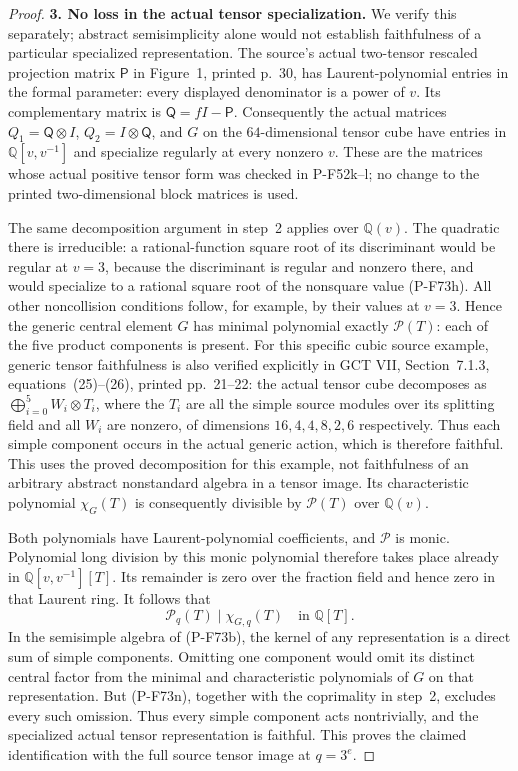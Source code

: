\begin{proof}
\par\medskip\noindent\textbf{3. No loss in the actual tensor specialization.}
We verify this separately; abstract semisimplicity
alone would not establish faithfulness of a particular
specialized representation.
The source's actual two-tensor rescaled projection
matrix $\mathsf P$ in Figure~1, printed p.~30, has
Laurent-polynomial entries in the formal parameter:
every displayed denominator is a power of $v$.
Its complementary matrix is $\mathsf Q=fI-\mathsf P$.
Consequently the actual matrices
$Q_1=\mathsf Q\otimes I$, $Q_2=I\otimes\mathsf Q$,
and $G$ on the $64$-dimensional tensor cube have
entries in $\mathbb Q[v,v^{-1}]$ and specialize
regularly at every nonzero $v$.
These are the matrices whose actual positive tensor
form was checked in P-F52k--l; no change to the
printed two-dimensional block matrices is used.

The same decomposition argument in step~2 applies
over $\mathbb Q(v)$.  The quadratic there is
irreducible: a rational-function square root of its
discriminant would be regular at $v=3$, because
the discriminant is regular and nonzero there, and
would specialize to a rational square root of the
nonsquare value (P-F73h).  All other noncollision
conditions follow, for example, by their values
at $v=3$.  Hence the generic central element $G$
has minimal polynomial exactly $\mathcal P(T)$:
each of the five product components is present.
For this specific cubic source example, generic tensor
faithfulness is also verified explicitly in GCT VII,
Section~7.1.3, equations~(25)--(26), printed pp.~21--22:
the actual tensor cube decomposes as
$\bigoplus_{i=0}^5 W_i\otimes T_i$, where the $T_i$
are all the simple source modules over its splitting
field and all $W_i$ are nonzero, of dimensions
$16,4,4,8,2,6$ respectively.  Thus each simple
component occurs in the actual generic action,
which is therefore faithful.  This uses the proved
decomposition for this example, not faithfulness of
an arbitrary abstract nonstandard algebra in a tensor
image.  Its characteristic polynomial
$\chi_G(T)$ is consequently divisible by
$\mathcal P(T)$ over $\mathbb Q(v)$.

Both polynomials have Laurent-polynomial
coefficients, and $\mathcal P$ is monic.
Polynomial long division by this monic polynomial
therefore takes place already in
$\mathbb Q[v,v^{-1}][T]$.  Its remainder is zero
over the fraction field and hence zero in that
Laurent ring.  It follows that
\[
             \mathcal P_q(T)\mid\chi_{G,q}(T)
                               \quad\text{in }\mathbb Q[T].
                                                               \tag{P-F73n}
\]
In the semisimple algebra of (P-F73b), the kernel
of any representation is a direct sum of simple
components.  Omitting one component would omit
its distinct central factor from the minimal and
characteristic polynomials of $G$ on that
representation.  But (P-F73n), together with the
coprimality in step~2, excludes every such omission.
Thus every simple component acts nontrivially,
and the specialized actual tensor representation
is faithful.  This proves the claimed identification
with the full source tensor image at $q=3^e$.


\end{proof}
